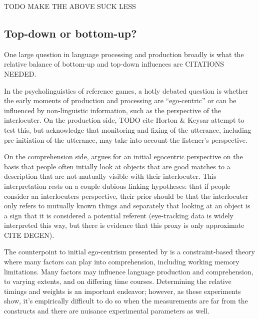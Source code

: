 \documentclass[]{article}
\begin{document}
TODO MAKE THE ABOVE SUCK LESS

\subsection{Top-down or bottom-up?}
One large question in language processing and production broadly is what the relative balance of bottom-up and top-down influences are CITATIONS NEEDED. 

In the psycholinguistics of reference games, a hotly debated question is whether the early moments of production and processing are ``ego-centric'' or can be influenced by non-linguistic information, such as the perspective of the interlocuter. On the production side, TODO cite Horton \& Keysar attempt to test this, but acknowledge that monitoring and fixing of the utterance, including pre-initiation of the utterance, may take into account the listener's perspective. %

On the comprehension side, \cite{keysar2000} argues for an initial egocentric perspective on the basis that people often intially look at objects that are good matches to a description that are not mutually visible with their interlocuter. This interpretation rests on a couple dubious linking hypotheses: that if people consider an interlocuters perspective, their prior should be that the interlocuter only refers to mutually known things and separately that looking at an object is a sign that it is considered a potential referent (eye-tracking data is widely interpreted this way, but there is evidence that this proxy is only approximate CITE DEGEN).

The counterpoint to initial ego-centrism presented by \cite{hanna2003} is a constraint-based theory where many factors can play into comprehension, including working memory limitations. Many factors may influence language production and comprehension, to varying extents, and on differing time courses. Determining the relative timings and weights is an important endeavor; however, as these experiments show, it's empirically difficult to do so when the measurements are far from the constructs and there are nuisance experimental parameters as well. 
\end{document}
